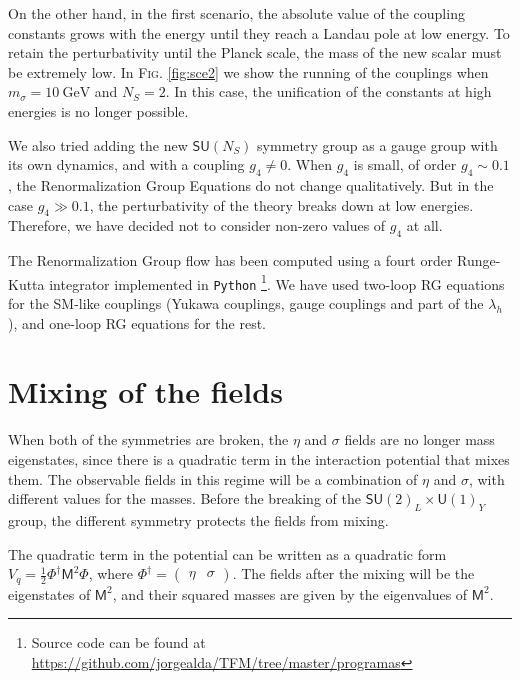 \documentclass[aps,prd,preprintnumbers,nofootinbibn,twocolumn]{revtex4}
\begin{document}
On the other hand, in the first scenario, the absolute value of the coupling constants grows with the energy until they reach a Landau pole at low energy. To retain the perturbativity until the Planck scale, the mass of the new scalar must be extremely low. In \textsc{Fig.} \ref{fig:sce2} we show the running of the couplings when $m_\sigma =\SI{10}{\giga\electronvolt}$ and $N_S = 2$. In this case, the unification of the constants at high energies is no longer possible. 

We also tried adding the new $\mathsf{SU}(N_S)$ symmetry group as a gauge group with its own dynamics, and with a coupling $g_4\neq 0$. When $g_4$ is small, of order $g_4\sim 0.1$, the Renormalization Group Equations do not change qualitatively. But in the case $g_4 \gg 0.1$, the perturbativity of the theory breaks down at low energies. Therefore, we have decided not to consider non-zero values of $g_4$ at all.

The Renormalization Group flow has been computed using a fourt order Runge-Kutta integrator implemented in \texttt{Python} \footnote{Source code can be found at \url{https://github.com/jorgealda/TFM/tree/master/programas}}. We have used two-loop RG equations for the SM-like couplings (Yukawa couplings, gauge couplings and part of the $\lambda_h$)\cite{Arason:1991ic}, and one-loop RG equations for the rest.

\section{Mixing of the fields} \label{sec:mixing}


When both of the symmetries are broken, the $\eta$ and $\sigma$ fields are no longer mass eigenstates, since there is a quadratic term in the interaction potential that mixes them. The observable fields in this regime will be a combination of $\eta$ and $\sigma$, with different values for the masses. Before the breaking of the $\mathsf{SU}(2)_L\times \mathsf{U}(1)_Y$ group, the different symmetry protects the fields from mixing.

The quadratic term in the potential can be written as a quadratic form $V_q = \frac{1}{2}\Phi^\dagger \mathsf{M}^2 \Phi$, where $\Phi^\dagger = \begin{pmatrix}\eta & \sigma \end{pmatrix} $. The fields after the mixing will be the eigenstates of $\mathsf{M}^2$, and their squared masses are given by the eigenvalues of $\mathsf{M}^2$.
\end{document}

